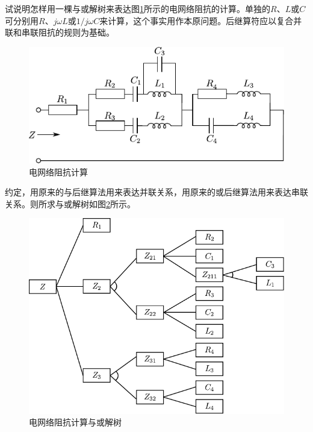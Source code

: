 \begin{question}
试说明怎样用一棵与或解树来表达图\ref{Fig:elec}所示的电网络阻抗的计算。单独的$R$、$L$或$C$可分别用$R$、$j\omega L$或$1/j\omega C$来计算，这个事实用作本原问题。后继算符应以复合并联和串联阻抗的规则为基础。
	\begin{figure}[H]
		\centering
		\includegraphics{figures/ques-2.4.pdf}
		\caption{电网络阻抗计算} \label{Fig:elec}
	\end{figure}
\end{question}
\begin{solution}
约定，用原来的与后继算法用来表达并联关系，用原来的或后继算法用来表达串联关系。则所求与或解树如图\ref{Fig:and-or-tree-for-elec}所示。
	\begin{figure}[h]
		\centering
		\includegraphics{figures/ans-2.4.pdf}
		\caption{电网络阻抗计算与或解树} \label{Fig:and-or-tree-for-elec}
	\end{figure}
\end{solution}


